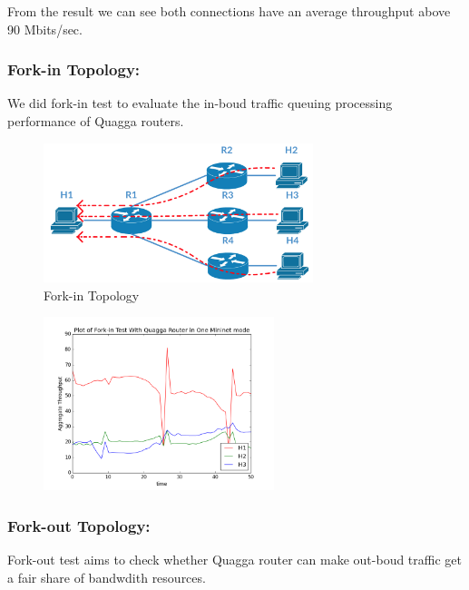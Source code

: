 From the result we can see both connections have an average throughput
above 90 Mbits/sec.

\subsubsection{Fork-in Topology:}\label{fork-in-topology}

We did fork-in test to evaluate the in-boud traffic queuing processing
performance of Quagga routers.

\begin{figure}[h]
\centering
\includegraphics[width=0.7\textwidth]{./Figure/OneMininet(SDN+NONSDN)/ForkIn/ForkIn(OneMininet).png}
\caption{Fork-in Topology \label{fig:Fork-in Topology}}
\end{figure}

\begin{figure}[h]
\centering
\includegraphics[width=0.6\textwidth]{./Figure/OneMininet(SDN+NONSDN)/ForkIn/ForkIn2.png}
\end{figure}

\subsubsection{Fork-out Topology:}\label{fork-out-topology}

Fork-out test aims to check whether Quagga router can make out-boud
traffic get a fair share of bandwdith resources.

